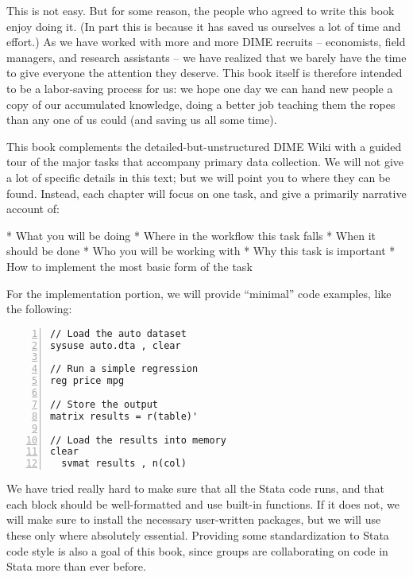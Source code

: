 This is not easy. But for some reason, the people who agreed to write this book enjoy doing it.
(In part this is because it has saved us ourselves a lot of time and effort.)
As we have worked with more and more DIME recruits -- economists, field managers, and research assistants --
we have realized that we barely have the time to give everyone the attention they deserve.
This book itself is therefore intended to be a labor-saving process for us:
we hope one day we can hand new people a copy of our accumulated knowledge,
doing a better job teaching them the ropes than any one of us could (and saving us all some time).

This book complements the detailed-but-unstructured DIME Wiki
with a guided tour of the major tasks that accompany primary data collection.
We will not give a lot of specific details in this text;
but we will point you to where they can be found.
Instead, each chapter will focus on one task, and give a primarily narrative account of:

* What you will be doing
* Where in the workflow this task falls
* When it should be done
* Who you will be working with
* Why this task is important
* How to implement the most basic form of the task

For the implementation portion, we will provide ``minimal'' code examples, like the following:


\begin{Verbatim}[frame=lines,numbers=left,label=code.do]
// Load the auto dataset
sysuse auto.dta , clear

// Run a simple regression
reg price mpg

// Store the output
matrix results = r(table)'

// Load the results into memory
clear
  svmat results , n(col)
\end{Verbatim}

We have tried really hard to make sure that all the Stata code runs,
and that each block should be well-formatted and use built-in functions.
If it does not, we will make sure to install the necessary user-written packages,
but we will use these only where absolutely essential.
Providing some standardization to Stata code style is also a goal of this book,
since groups are collaborating on code in Stata more than ever before.

